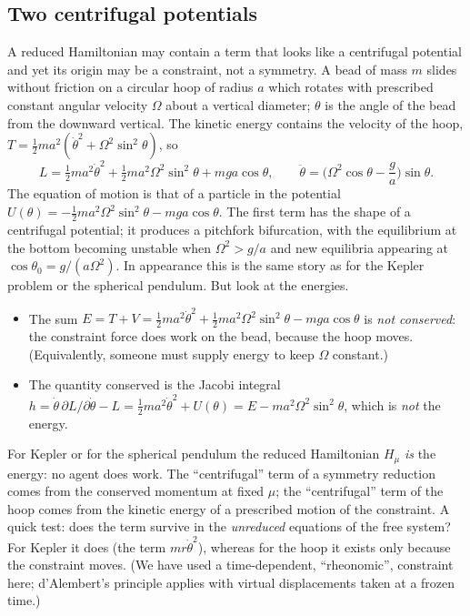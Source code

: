 \subsection{Two centrifugal potentials}\label{rd:sec:rotating}

A reduced Hamiltonian may contain a term that looks like a centrifugal potential and yet its origin may be a constraint, not a symmetry. A bead of mass $m$ slides without friction on a circular hoop of radius $a$ which rotates with prescribed constant angular velocity $\Omega$ about a vertical diameter; $\theta$ is the angle of the bead from the downward vertical. The kinetic energy contains the velocity of the hoop, $T=\tfrac12ma^2(\dot\theta^2+\Omega^2\sin^2\theta)$, so
\begin{equation}\label{rd:Lhoop}
L=\tfrac12ma^2\dot\theta^2+\tfrac12ma^2\Omega^2\sin^2\theta+mga\cos\theta,\qquad
\ddot\theta=\Big(\Omega^2\cos\theta-\frac ga\Big)\sin\theta .
\end{equation}
The equation of motion is that of a particle in the potential $U(\theta)=-\tfrac12ma^2\Omega^2\sin^2\theta-mga\cos\theta$. The first term has the shape of a centrifugal potential; it produces a pitchfork bifurcation, with the equilibrium at the bottom becoming unstable when $\Omega^2>g/a$ and new equilibria appearing at $\cos\theta_0=g/(a\Omega^2)$. In appearance this is the same story as for the Kepler problem or the spherical pendulum. But look at the energies.

\begin{itemize}
\item The sum $E=T+V=\tfrac12ma^2\dot\theta^2+\tfrac12ma^2\Omega^2\sin^2\theta-mga\cos\theta$ is \emph{not conserved}: the constraint force does work on the bead, because the hoop moves. (Equivalently, someone must supply energy to keep $\Omega$ constant.)
\item The quantity conserved is the Jacobi integral $h=\dot\theta\,\partial L/\partial\dot\theta-L=\tfrac12ma^2\dot\theta^2+U(\theta)=E-ma^2\Omega^2\sin^2\theta$, which is \emph{not} the energy.
\end{itemize}
For Kepler or for the spherical pendulum the reduced Hamiltonian $H_\mu$ \emph{is} the energy: no agent does work. The ``centrifugal'' term of a symmetry reduction comes from the conserved momentum at fixed $\mu$; the ``centrifugal'' term of the hoop comes from the kinetic energy of a prescribed motion of the constraint. A quick test: does the term survive in the \emph{unreduced} equations of the free system? For Kepler it does (the term $mr\dot\theta^2$), whereas for the hoop it exists only because the constraint moves. (We have used a time-dependent, ``rheonomic'', constraint here; d'Alembert's principle applies with virtual displacements taken at a frozen time.)

